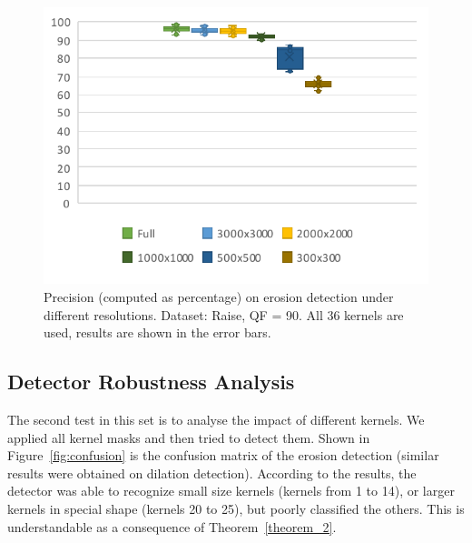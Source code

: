 \documentclass{ieeeaccess}
\begin{document}
\begin{figure}[t!]
	\centering
	\includegraphics[width=\linewidth]{resolutions.pdf}
	\caption{Precision (computed as percentage) on erosion detection under different resolutions. Dataset: Raise, QF = 90. All 36 kernels are used, results are shown in the error bars.}
	\label{fig:resolutions}
\end{figure}

\subsection{Detector Robustness Analysis}
\label{subsec:result_attacks}

The second test in this set is to analyse the impact of different kernels. We applied all kernel masks and then tried to detect them. Shown in Figure~\ref{fig:confusion} is the confusion matrix of the erosion detection (similar results were obtained on dilation detection). According to the results, the detector was able to recognize small size kernels (kernels from 1 to 14), or larger kernels in special shape (kernels 20 to 25), but poorly classified the others. This is understandable as a consequence of Theorem~\ref{theorem_2}.
\end{document}
